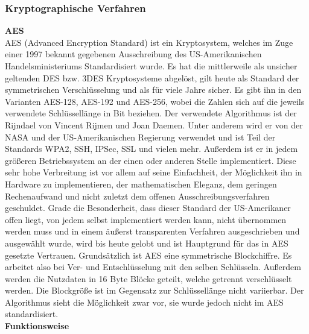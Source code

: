\documentclass[12pt,a4paper,bibliography=totocnumbered,listof=totocnumbered]{scrartcl}
\begin{document}
\subsubsection{Kryptographische Verfahren}
\textbf{AES}\\
AES (Advanced Encryption Standard) ist ein Kryptosystem, welches im Zuge einer 1997 bekannt gegebenen Ausschreibung des US-Amerikanischen Handelsministeriums Standardisiert wurde. Es hat die mittlerweile als unsicher geltenden DES bzw. 3DES Kryptosysteme abgelöst, gilt heute als Standard der symmetrischen Verschlüsselung und als für viele Jahre sicher. Es gibt ihn in den Varianten AES-128, AES-192 und AES-256, wobei die Zahlen sich auf die jeweils verwendete Schlüssellänge in Bit beziehen. Der verwendete Algorithmus ist der Rijndael von Vincent Rijmen und Joan Daemen. Unter anderem wird er von der NASA und der US-Amerikanischen Regierung verwendet und ist Teil der Standards WPA2, SSH, IPSec, SSL und vielen mehr. Außerdem ist er in jedem größeren Betriebssystem an der einen oder anderen Stelle implementiert. Diese sehr hohe Verbreitung ist vor allem auf seine Einfachheit, der Möglichkeit ihn in Hardware zu implementieren, der mathematischen Eleganz, dem geringen Rechenaufwand und nicht zuletzt dem offenen Ausschreibungsverfahren geschuldet. Grade die Besonderheit, dass dieser Standard der US-Amerikaner offen liegt, von jedem selbst implementiert werden kann, nicht übernommen werden muss und in einem äußerst transparenten Verfahren ausgeschrieben und ausgewählt wurde, wird bis heute gelobt und ist Hauptgrund für das in AES gesetzte Vertrauen. Grundsätzlich ist AES eine symmetrische Blockchiffre. Es arbeitet also bei Ver- und Entschlüsselung mit den selben Schlüsseln. Außerdem werden die Nutzdaten in 16 Byte Blöcke geteilt, welche getrennt verschlüsselt werden. Die Blockgröße ist im Gegensatz zur Schlüssellänge nicht variierbar. Der Algorithmus sieht die Möglichkeit zwar vor, sie wurde jedoch nicht im AES standardisiert.
\\\textbf{Funktionsweise}\\ 
\end{document}
